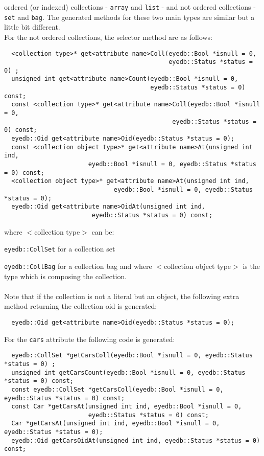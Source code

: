 ordered (or indexed) collections - \texttt{array} and \texttt{list} - and not
ordered collections - \texttt{set} and \texttt{bag}.
The generated methods for these two main types are similar but a
little bit different.
\\
For the not ordered collections, the selector method are as follows:
\verbsize
\begin{verbatim}
  <collection type>* get<attribute name>Coll(eyedb::Bool *isnull = 0,
                                             eyedb::Status *status = 0) ;
  unsigned int get<attribute name>Count(eyedb::Bool *isnull = 0,
                                        eyedb::Status *status = 0) const;
  const <collection type>* get<attribute name>Coll(eyedb::Bool *isnull = 0,
                                              eyedb::Status *status = 0) const;
  eyedb::Oid get<attribute name>Oid(eyedb::Status *status = 0);
  const <collection object type>* get<attribute name>At(unsigned int ind,
                       eyedb::Bool *isnull = 0, eyedb::Status *status = 0) const;
  <collection object type>* get<attribute name>At(unsigned int ind,
                              eyedb::Bool *isnull = 0, eyedb::Status *status = 0);
  eyedb::Oid get<attribute name>OidAt(unsigned int ind,
                        eyedb::Status *status = 0) const;
\end{verbatim}
\normalsize
where $<$collection type$>$ can be:
\be
\item \texttt{eyedb::CollSet} for a collection set
\item \texttt{eyedb::CollBag} for a collection bag
\ee
and where $<$collection object type$>$ is the type which is composing
the collection.
\\
\\
Note that if the collection is not a literal but an object, the following
extra method returning the collection oid is generated:
\verbsize
\begin{verbatim}
  eyedb::Oid get<attribute name>Oid(eyedb::Status *status = 0);
\end{verbatim}
\normalsize
For the \texttt{cars} attribute the following code is generated:
\verbsize
\begin{verbatim}
  eyedb::CollSet *getCarsColl(eyedb::Bool *isnull = 0, eyedb::Status *status = 0) ;
  unsigned int getCarsCount(eyedb::Bool *isnull = 0, eyedb::Status *status = 0) const;
  const eyedb::CollSet *getCarsColl(eyedb::Bool *isnull = 0, eyedb::Status *status = 0) const;
  const Car *getCarsAt(unsigned int ind, eyedb::Bool *isnull = 0,
                       eyedb::Status *status = 0) const;
  Car *getCarsAt(unsigned int ind, eyedb::Bool *isnull = 0, eyedb::Status *status = 0);
  eyedb::Oid getCarsOidAt(unsigned int ind, eyedb::Status *status = 0) const;
\end{verbatim}
